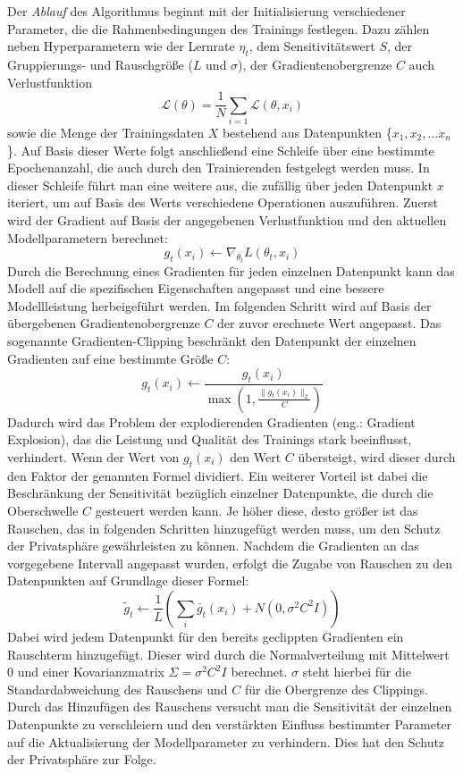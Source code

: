 Der \textit{Ablauf} des Algorithmus beginnt mit der Initialisierung verschiedener Parameter, die die Rahmenbedingungen des Trainings festlegen. Dazu zählen neben Hyperparametern wie der Lernrate $\eta_t$, dem Sensitivitätswert $S$, der Gruppierungs- und Rauschgröße ($L$ und $\sigma$), der Gradientenobergrenze $C$ auch Verlustfunktion 
\begin{equation}
	\mathcal{L}(\theta) = \frac{1}{N} \sum_{i=1} \mathcal{L}(\theta,x_i)
\end{equation}
sowie die Menge der Trainingsdaten $X$ bestehend aus Datenpunkten \{$x_1, x_2, \dots x_n$\}. Auf Basis dieser Werte folgt anschließend eine Schleife über eine bestimmte Epochenanzahl, die auch durch den Trainierenden festgelegt werden muss. In dieser Schleife führt man eine weitere aus, die zufällig über jeden Datenpunkt $x$ iteriert, um auf Basis des Werts verschiedene Operationen auszuführen. Zuerst wird der Gradient auf Basis der angegebenen Verlustfunktion und den aktuellen Modellparametern berechnet: 
\begin{equation}
	g_t(x_i) \leftarrow \nabla_{\theta_t} L(\theta_t, x_i)
\end{equation}
Durch die Berechnung eines Gradienten für jeden einzelnen Datenpunkt kann das Modell auf die spezifischen Eigenschaften angepasst und eine bessere Modellleistung herbeigeführt werden. Im folgenden Schritt wird auf Basis der übergebenen Gradientenobergrenze $C$ der zuvor erechnete Wert angepasst. Das sogenannte \glqq Gradienten-Clipping\grqq{} beschränkt den Datenpunkt der einzelnen Gradienten auf eine bestimmte Größe $C$: 
\begin{equation} 
	g_t(x_i) \leftarrow \frac{g_t(x_i)}{\max \left(1, \frac{\|g_t(x_i)\|_2}{C}\right)}
\end{equation}
Dadurch wird das Problem der explodierenden Gradienten (eng.: Gradient Explosion), das die Leistung und Qualität des Trainings stark beeinflusst, verhindert. Wenn der Wert von $g_t(x_i)$ den Wert $C$ übersteigt, wird dieser durch den Faktor der genannten Formel dividiert. Ein weiterer Vorteil ist dabei die Beschränkung der Sensitivität bezüglich einzelner Datenpunkte, die durch die Oberschwelle $C$ gesteuert werden kann. Je höher diese, desto größer ist das Rauschen, das in folgenden Schritten hinzugefügt werden muss, um den Schutz der Privatsphäre gewährleisten zu können.
Nachdem die Gradienten an das vorgegebene Intervall angepasst wurden, erfolgt die Zugabe von Rauschen zu den Datenpunkten auf Grundlage dieser Formel:
\begin{equation}
	\tilde{g}_t \leftarrow \frac{1}{L} \left( \sum_i \bar{g}_t(x_i) + N(0, \sigma^2C^2I) \right)
\end{equation}
Dabei wird jedem Datenpunkt für den bereits \glqq geclippten\grqq{} Gradienten ein Rauschterm hinzugefügt. Dieser wird durch die Normalverteilung mit Mittelwert 0 und einer Kovarianzmatrix $\Sigma = \sigma^2C^2I $ berechnet. $\sigma$ steht hierbei für die Standardabweichung des Rauschens und $C$ für die Obergrenze des Clippings. Durch das Hinzufügen des Rauschens versucht man die Sensitivität der einzelnen Datenpunkte zu verschleiern und den verstärkten Einfluss bestimmter Parameter auf die Aktualisierung der Modellparameter zu verhindern. Dies hat den Schutz der Privatsphäre zur Folge.

